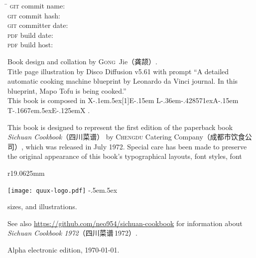 \endgroup

\vfill

\setlength{\parskip}{.3125\baselineskip}%
\vspace{-2\baselineskip}
\begin{tabbing}
\hspace{9.5625em}\= \kill
\textsc{git} commit name:       \>\texttt{\gitcommitname}\\
\textsc{git} commit hash:       \>\texttt{\gitcommithash}\\
\textsc{git} committer date:    \>\texttt{\gitcommitterdate}\\
\textsc{pdf} build date:        \>\texttt{\pdfbuilddate}\\
\textsc{pdf} build host:        \>\texttt{\pdfbuildhost}
\end{tabbing}
\vspace{-\baselineskip}

Book design and collation by \textsc{Gong}~Jie\!（龚颉）\!\!.\\
Title page illustration by Disco Diffusion v5.61 with prompt ``A detailed
automatic cooking machine blueprint by Leonardo da Vinci journal. In this
blueprint, Mapo Tofu is being cooked.''\\
This book is composed in
\begingroup%
\rmfamily%
\footnotesize%
X\kern-.1em\lower.5ex\hbox{\scalebox{-1}[1]{E}}\kern-.15em%
L\kern-.36em\lower-.428571ex\hbox{\tiny{A}}\kern-.15em%
T\kern-.1667em\lower.5ex\hbox{E}\kern-.125emX%
\endgroup%
.

This book is designed to represent the first edition of the paperback book
\textit{Sichuan Cookbook}{\kafamily（四川菜谱）}\!\! by \textsc{Chengdu}
Catering Company\!（成都市饮食公司）\!\!, which was released in July 1972.
Special care has been made to preserve the original appearance of this book's
typographical layouts, font styles, font
\begin{wrapfigure}{r}{19.0625mm}%
\vspace{-1.25\baselineskip}%
\begin{flushright}%
\quad\texttt{[image: quux-logo.pdf]}%
{\sffamily\tiny\kern-.5em\lower.5ex\hbox{\texttrademark}}%
\end{flushright}%
\vspace{-1.75\baselineskip}%
\end{wrapfigure}%
sizes, and illustrations.

See also \url{https://github.com/neo954/sichuan-cookbook} for information
about \textit{Sichuan Cookbook 1972}{\kafamily（四川菜谱\,1972）}\!\!.

Alpha electronic edition, \today.

\endgroup%

